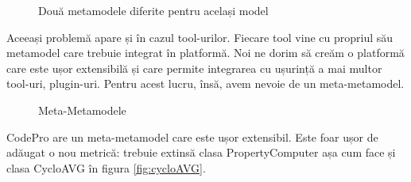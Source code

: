 \begin{figure}
\caption{Două metamodele diferite pentru același model}
\label{fig:metamodels}
\end{figure}
	
	Aceeași problemă apare și în cazul tool-urilor. Fiecare tool vine cu propriul
său metamodel care trebuie integrat în platformă. Noi ne dorim să creăm o
platformă care este ușor extensibilă și care permite integrarea cu ușurință a mai multor tool-uri, plugin-uri. 
Pentru acest lucru, însă, avem nevoie de un meta-metamodel.

\begin{figure}
\centering
{}
\caption{Meta-Metamodele}
\label{fig:metametamodel}
\end{figure}	
	
	CodePro are  un  meta-metamodel care este ușor extensibil. 
Este foar ușor de adăugat o nou metrică: trebuie extinsă clasa PropertyComputer
așa cum face și clasa CycloAVG în figura \ref{fig:cycloAVG}. 

